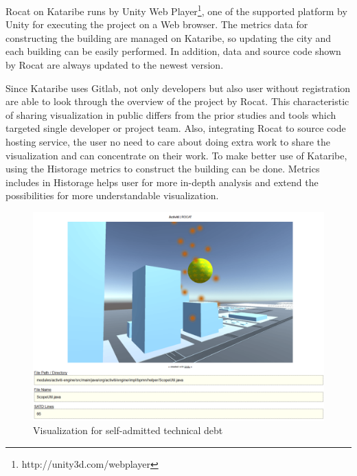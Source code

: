 \documentclass[conference]{IEEEtran}
\begin{document}
\textsf{Rocat} on \textsf{Kataribe} runs by \textsf{Unity Web Player}\footnote{http://unity3d.com/webplayer}, one of the supported platform by \textsf{Unity} for executing the project on a Web browser.
The metrics data for constructing the building are managed on \textsf{Kataribe}, so updating the city and each building can be easily performed.
In addition, data and source code shown by \textsf{Rocat} are always updated to the newest version.

Since \textsf{Kataribe} uses \textsf{Gitlab}, not only developers but also user without registration are able to look through the overview of the project by \textsf{Rocat}.
This characteristic of sharing visualization in public differs from the prior studies and tools which targeted single developer or project team.
Also, integrating \textsf{Rocat} to source code hosting service, the user no need to care about doing extra work to share the visualization and can concentrate on their work.
To make better use of \textsf{Kataribe}, using the \textsf{Historage} metrics to construct the building can be done.
Metrics includes in \textsf{Historage} helps user for more in-depth analysis and extend the possibilities for more understandable visualization.


\begin{figure}[tb]
\centering
\includegraphics[width=\linewidth]{satd.pdf}
\caption{Visualization for self-admitted technical debt}
\label{figure:SATD}
\end{figure}
\end{document}
